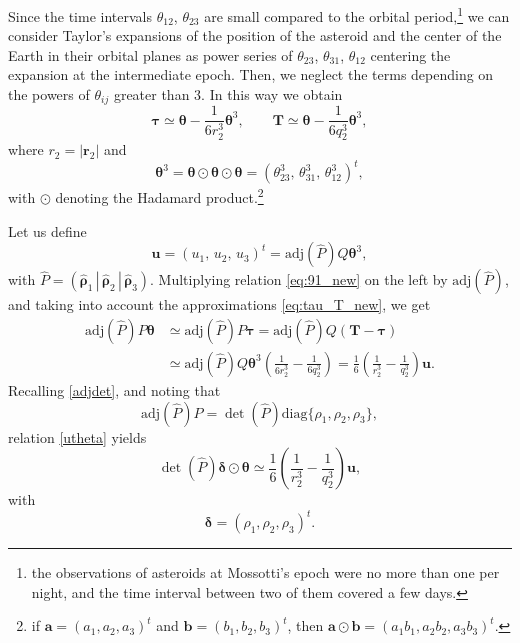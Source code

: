 \documentclass[11pt]{article}
\def\br{\bm{r}}
\def\adj{\text{adj}}
\begin{document}
Since the time intervals $\theta_{12}$, $\theta_{23}$ are small compared to the orbital period,\footnote{ the observations of asteroids at Mossotti's epoch were no more than one per night, and the time interval between two of them covered a few days.}
we can consider Taylor's expansions of the position of the asteroid and the center of the Earth in their orbital planes as power series of $\theta_{23}$, $\theta_{31}$, $\theta_{12}$ centering the expansion at the intermediate epoch. 
Then, we neglect the terms depending on the powers of $\theta_{ij}$ greater than 3. 
In this way we obtain
\begin{equation}
    \bm{\tau} \simeq \bm{\theta} - \frac{1}{6r_2^3}\bm{\theta}^3, \quad\quad
    \bm{T} \simeq \bm{\theta} - \frac{1}{6q_2^3}\bm{\theta}^3,
    \label{eq:tau_T_new}
\end{equation}
where $r_2=|\br_2|$ and
\begin{equation*}
    \bm{\theta}^3 = \bm{\theta} \odot \bm{\theta} \odot \bm{\theta} = \left(
    \theta_{23}^3,\,\theta_{31}^3,\,\theta_{12}^3\right)^t,
\end{equation*}
with $\odot$ denoting the Hadamard product.\footnote{ if $\bm{a}=(a_1,a_2,a_3)^t$ and $\bm{b}=(b_1,b_2,b_3)^t$, then $\bm{a}\odot\bm{b} = (a_1b_1,a_2b_2,a_3b_3)^t$.}

Let us define
\begin{equation*}
    \bm{u}=(u_1,\,u_2,\,u_3)^t=\adj(\hat{P})Q{\bm{\theta}^3},
\end{equation*}
with $\hat{P} = (\hat{\bm{\rho}}_1\, |\, \hat{\bm{\rho}}_2 \,|\,
\hat{\bm{\rho}}_3)$.
Multiplying relation \eqref{eq:91_new} on the left by $\adj(\hat{P})$, and taking into account the approximations \eqref{eq:tau_T_new}, we get
\begin{equation}
    \begin{aligned}
        \adj(\hat{P})P\bm{\theta} & \simeq \adj(\hat{P})P\bm{\tau} = \adj(\hat{P})Q(\bm{T}-\bm{\tau})\\
        & \simeq \adj(\hat{P})Q\bm{\theta}^3\left(\frac{1}{6r_2^3} - \frac{1}{6q_2^3}\right)
        = \frac{1}{6}\left(\frac{1}{r_2^3} - \frac{1}{q_2^3}\right)\bm{u}.
  \end{aligned}
  \label{utheta}
\end{equation}
Recalling \eqref{adjdet}, and noting that
\begin{equation*}
\adj(\hat{P})P = \det(\hat{P})\textrm{diag}\{\rho_1,\rho_2,\rho_3\},
\end{equation*}
relation
\eqref{utheta} yields
\begin{equation}
    \det(\hat{P})\bm{\delta}\odot\bm{\theta} \simeq \frac{1}{6}\left(\frac{1}{r_2^3} - \frac{1}{q_2^3}\right) \bm{u},
    \label{eq:urel}
\end{equation}
with
\begin{equation*}
    \bm{\delta} = (\rho_1,\rho_2,\rho_3)^t.
\end{equation*}
\end{document}
